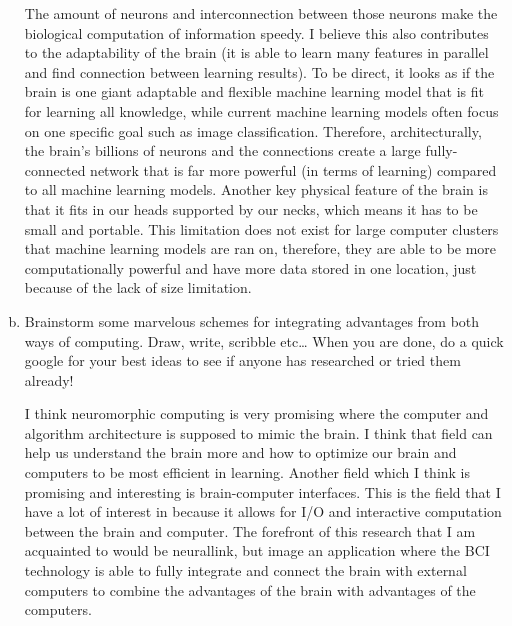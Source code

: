 \documentclass[letterpaper,11pt]{article}
\begin{document}
\begin{enumerate}[a)]
\begin{tcolorbox}
The amount of neurons and interconnection between those neurons make the biological computation of information speedy. I believe this also contributes to the adaptability of the brain (it is able to learn many features in parallel and find connection between learning results). To be direct, it looks as if the brain is one giant adaptable and flexible machine learning model that is fit for learning all knowledge, while current machine learning models often focus on one specific goal such as image classification. Therefore, architecturally, the brain's billions of neurons and the connections create a large fully-connected network that is far more powerful (in terms of learning) compared to all machine learning models. Another key physical feature of the brain is that it fits in our heads supported by our necks, which means it has to be small and portable. This limitation does not exist for large computer clusters that machine learning models are ran on, therefore, they are able to be more computationally powerful and have more data stored in one location, just because of the lack of size limitation.
\end{tcolorbox}

\item Brainstorm some marvelous schemes for integrating advantages from both ways of computing. Draw, write, scribble etc… When you are done, do a quick google for your best ideas to see if anyone has researched or tried them already!

\begin{tcolorbox}
I think neuromorphic computing is very promising where the computer and algorithm architecture is supposed to mimic the brain. I think that field can help us understand the brain more and how to optimize our brain and computers to be most efficient in learning. Another field which I think is promising and interesting is brain-computer interfaces. This is the field that I have a lot of interest in because it allows for I/O and interactive computation between the brain and computer. The forefront of this research that I am acquainted to would be neurallink, but image an application where the BCI technology is able to fully integrate and connect the brain with external computers to combine the advantages of the brain with advantages of the computers.
\end{tcolorbox}
    
\end{enumerate}
\end{document}
